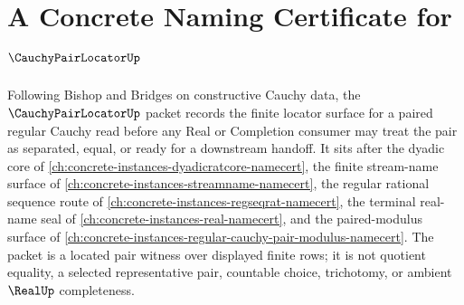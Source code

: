 \chapter{A Concrete Naming Certificate for $\CauchyPairLocatorUp$}
\label{ch:concrete-instances-cauchy-pair-locator-namecert}

Following Bishop and Bridges on constructive Cauchy data, the $\CauchyPairLocatorUp$ packet records the finite locator surface for a paired regular Cauchy read before any Real or Completion consumer may treat the pair as separated, equal, or ready for a downstream handoff. It sits after the dyadic core of \autoref{ch:concrete-instances-dyadicratcore-namecert}, the finite stream-name surface of \autoref{ch:concrete-instances-streamname-namecert}, the regular rational sequence route of \autoref{ch:concrete-instances-regseqrat-namecert}, the terminal real-name seal of \autoref{ch:concrete-instances-real-namecert}, and the paired-modulus surface of \autoref{ch:concrete-instances-regular-cauchy-pair-modulus-namecert}. The packet is a located pair witness over displayed finite rows; it is not quotient equality, a selected representative pair, countable choice, trichotomy, or ambient $\RealUp$ completeness.

